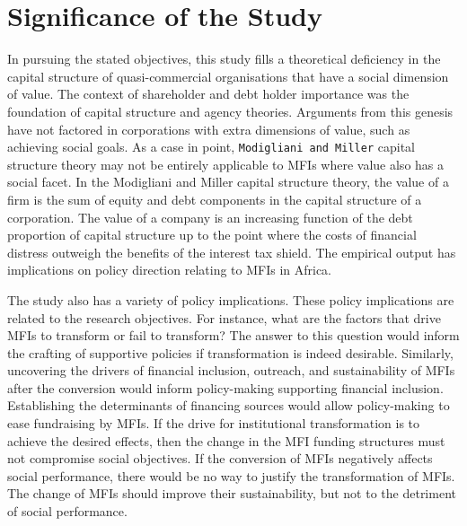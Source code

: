 \documentclass[a4paper, nobind]{templates/ociamthesis}
\begin{document}
\hypertarget{significance-of-the-study}{%
\section{Significance of the Study}\label{significance-of-the-study}}

\noindent In pursuing the stated objectives, this study fills a theoretical deficiency in the capital structure of quasi-commercial organisations that have a social dimension of value. The context of shareholder and debt holder importance was the foundation of capital structure and agency theories. Arguments from this genesis have not factored in corporations with extra dimensions of value, such as achieving social goals. As a case in point, \texttt{Modigliani\ and\ Miller} capital structure theory may not be entirely applicable to MFIs where value also has a social facet. In the Modigliani and Miller capital structure theory, the value of a firm is the sum of equity and debt components in the capital structure of a corporation. The value of a company is an increasing function of the debt proportion of capital structure up to the point where the costs of financial distress outweigh the benefits of the interest tax shield. The empirical output has implications on policy direction relating to MFIs in Africa.

The study also has a variety of policy implications. These policy implications are related to the research objectives. For instance, what are the factors that drive MFIs to transform or fail to transform? The answer to this question would inform the crafting of supportive policies if transformation is indeed desirable. Similarly, uncovering the drivers of financial inclusion, outreach, and sustainability of MFIs after the conversion would inform policy-making supporting financial inclusion. Establishing the determinants of financing sources would allow policy-making to ease fundraising by MFIs. If the drive for institutional transformation is to achieve the desired effects, then the change in the MFI funding structures must not compromise social objectives. If the conversion of MFIs negatively affects social performance, there would be no way to justify the transformation of MFIs. The change of MFIs should improve their sustainability, but not to the detriment of social performance.
\end{document}
